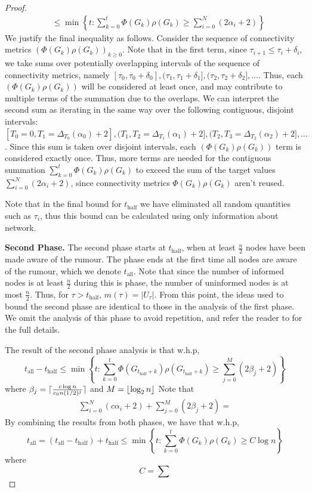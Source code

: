\begin{proof}
\begin{align*}
		&\leq \min \left\{t: \sum_{k=0}^t \Phi(G_k)\rho(G_k) \geq \sum_{i=0}^N (2 \alpha_i + 2) \right\}
	\end{align*}
	We justify the final inequality as follows. Consider the sequence of connectivity metrics $(\Phi(G_k)\rho(G_k))_{k \geq 0}$.
	Note that in the first term, since $\tau_{i+1} \leq \tau_i + \delta_i$, we take sums over potentially overlapping intervals of the sequence of connectivity metrics, namely $[\tau_0, \tau_0 + \delta_0], (\tau_1, \tau_1 + \delta_1], (\tau_2, \tau_2 + \delta_2], \dots$. Thus, each $(\Phi(G_k)\rho(G_k))$ will be considered at least once, and may contribute to multiple terms of the summation due to the overlaps. We can interpret the second sum as iterating in the same way over the following contiguous, disjoint intervals: $[T_0 = 0, T_1 = \Delta_{T_0}(\alpha_0) + 2], (T_1, T_2 = \Delta_{T_1}(\alpha_1) + 2], (T_2, T_3 = \Delta_{T_2}(\alpha_2) + 2], \dots$. Since this sum is taken over disjoint intervals, each $(\Phi(G_k)\rho(G_k))$ term is considered exactly once. Thus, more terms are needed for the contiguous summation $\sum_{k=0}^t \Phi(G_k)\rho(G_k)$ to exceed the sum of the target values $\sum_{i=0}^N (2 \alpha_i + 2)$, since connectivity metrics $\Phi(G_k)\rho(G_k)$ aren't reused.

	Note that in the final bound for $t_\text{half}$ we have eliminated all random quantities such as $\tau_i$, thus this bound can be calculated using only information about network.

	\textbf{Second Phase.} The second phase starts at $t_\text{half}$, when at least $\frac{n}{2}$ nodes have been made aware of the rumour. The phase ends at the first time all nodes are aware of the rumour, which we denote $t_\text{all}$. Note that since the number of informed nodes is at least $\frac{n}{2}$ during this is phase, the number of uninformed nodes is at most $\frac{n}{2}$. Thus, for $\tau > t_\text{half}$, $m(\tau) = |U_\tau|$. From this point, the ideas used to bound the second phase are identical to those in the analysis of the first phase. We omit the analysis of this phase to avoid repetition, and refer the reader to \cite{asyncPaper} for the full details. 

	The result of the second phase analysis is that w.h.p,
	$$
		t_\text{all} - t_\text{half} 
		\leq \min \left\{t: \sum_{k=0}^t \Phi(G_{t_\text{half} +k}) \rho(G_{t_\text{half} +k}) \geq \sum_{j=0}^M (2 \beta_j + 2) \right\}
	$$
	where $\beta_j = \lceil\frac{c \log n}{c_0 n(1/2)^j}\rceil$ and $M = \lfloor\log_2 n\rfloor$
	Note that 
	\begin{align*}
		\sum_{i=0}^N (c \alpha_i + 2) + \sum_{j=0}^M (2 \beta_j + 2)
		= 
	\end{align*} %
	By combining the results from both phases, we have that w.h.p,
	$$
		t_\text{all} = (t_\text{all} - t_\text{half}) + t_\text{half} \leq \min \left\{t : \sum_{k=0}^t \Phi(G_k)\rho(G_k) \geq C \log n \right\} 
	$$
	where 
	$$
		C = \sum %
	$$
\end{proof}


